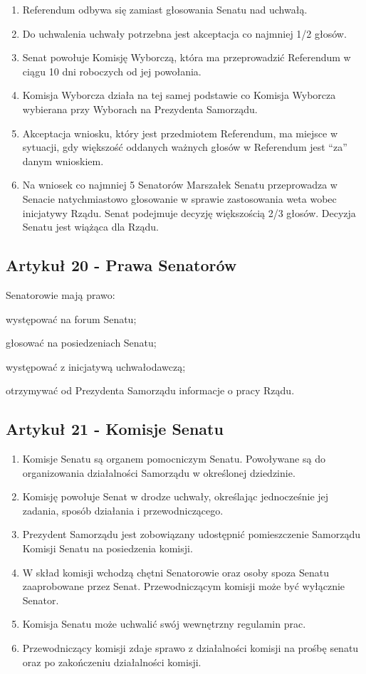 \documentclass[14pt]{article}
\newcounter{podpunktyCounter}
\newenvironment{podpunkty}
{%
	\begin{list}{\arabic{podpunktyCounter})}%
		{%
			\usecounter{podpunktyCounter}
			\setlength{\itemsep}{1pt}
			\setlength{\topsep}{3pt}
		}%
	}%
	{\end{list}}
\newenvironment{ustepy}{%
	\begin{enumerate}[leftmargin=1.5em, itemindent=1pt, labelwidth=1em, itemsep=5pt]
	}{%
	\end{enumerate}
}
\begin{document}
\begin{ustepy}
	\item Referendum odbywa się zamiast głosowania Senatu nad uchwałą.
	\item Do uchwalenia uchwały potrzebna jest akceptacja co najmniej 1/2 głosów.
	\item Senat powołuje Komisję Wyborczą, która ma przeprowadzić Referendum w ciągu 10 dni roboczych od jej powołania.
	\item Komisja Wyborcza działa na tej samej podstawie co Komisja Wyborcza wybierana przy Wyborach na Prezydenta Samorządu.
	\item Akceptacja wniosku, który jest przedmiotem Referendum, ma miejsce w sytuacji, gdy większość oddanych ważnych głosów w Referendum jest “za” danym wnioskiem.
	\item Na wniosek co najmniej 5 Senatorów Marszałek Senatu przeprowadza w Senacie natychmiastowo głosowanie w sprawie zastosowania weta wobec inicjatywy Rządu. Senat podejmuje decyzję większością 2/3 głosów. Decyzja Senatu jest wiążąca dla Rządu. 
\end{ustepy}
\subsection*{Artykuł 20 - Prawa Senatorów}
Senatorowie mają prawo:
\begin{podpunkty}
	\item występować na forum Senatu;
	\item głosować na posiedzeniach Senatu;
	\item występować z inicjatywą uchwałodawczą;
	\item otrzymywać od Prezydenta Samorządu informacje o pracy Rządu.
\end{podpunkty}

\subsection*{Artykuł 21 - Komisje Senatu}
\begin{ustepy}
	\item Komisje Senatu są organem pomocniczym Senatu. Powoływane są do organizowania działalności Samorządu w określonej dziedzinie.
	\item Komisję powołuje Senat w drodze uchwały, określając jednocześnie jej zadania, sposób działania i przewodniczącego.
	\item Prezydent Samorządu jest zobowiązany udostępnić pomieszczenie Samorządu Komisji Senatu na posiedzenia komisji.
	\item W skład komisji wchodzą chętni Senatorowie oraz osoby spoza Senatu zaaprobowane przez Senat. Przewodniczącym komisji może być wyłącznie Senator.
	\item Komisja Senatu może uchwalić swój wewnętrzny regulamin prac.
	\item Przewodniczący komisji zdaje sprawo z działalności komisji na prośbę senatu oraz po zakończeniu działalności komisji.
\end{ustepy}
\newpage
\end{document}
